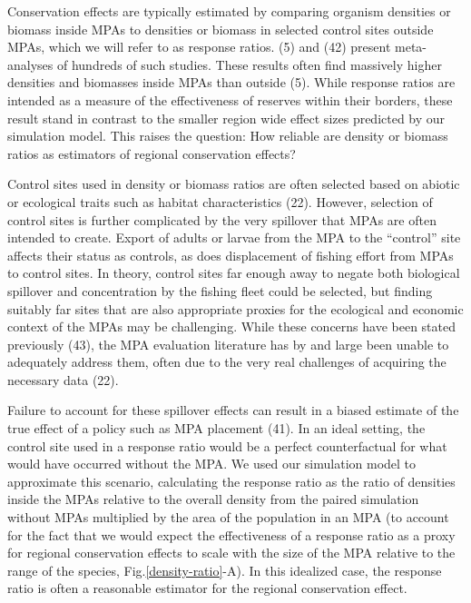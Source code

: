 \documentclass[9pt,twocolumn,twoside,lineno]{pnas-new}
\begin{document}
Conservation effects are typically estimated by comparing organism
densities or biomass inside MPAs to densities or biomass in selected
control sites outside MPAs, which we will refer to as response ratios.
(5) and (42) present meta-analyses of hundreds of such studies. These
results often find massively higher densities and biomasses inside MPAs
than outside (5). While response ratios are intended as a measure of the
effectiveness of reserves within their borders, these result stand in
contrast to the smaller region wide effect sizes predicted by our
simulation model. This raises the question: How reliable are density or
biomass ratios as estimators of regional conservation effects?

Control sites used in density or biomass ratios are often selected based
on abiotic or ecological traits such as habitat characteristics (22).
However, selection of control sites is further complicated by the very
spillover that MPAs are often intended to create. Export of adults or
larvae from the MPA to the ``control'' site affects their status as
controls, as does displacement of fishing effort from MPAs to control
sites. In theory, control sites far enough away to negate both
biological spillover and concentration by the fishing fleet could be
selected, but finding suitably far sites that are also appropriate
proxies for the ecological and economic context of the MPAs may be
challenging. While these concerns have been stated previously (43), the
MPA evaluation literature has by and large been unable to adequately
address them, often due to the very real challenges of acquiring the
necessary data (22).

Failure to account for these spillover effects can result in a biased
estimate of the true effect of a policy such as MPA placement (41). In
an ideal setting, the control site used in a response ratio would be a
perfect counterfactual for what would have occurred without the MPA. We
used our simulation model to approximate this scenario, calculating the
response ratio as the ratio of densities inside the MPAs relative to the
overall density from the paired simulation without MPAs multiplied by
the area of the population in an MPA (to account for the fact that we
would expect the effectiveness of a response ratio as a proxy for
regional conservation effects to scale with the size of the MPA relative
to the range of the species, Fig.\ref{density-ratio}-A). In this
idealized case, the response ratio is often a reasonable estimator for
the regional conservation effect.
\end{document}
